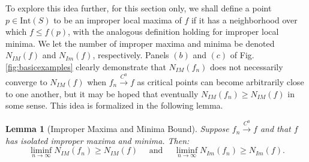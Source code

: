 \documentclass[11pt]{article}
\newcommand{\1}{\mathbf{1}}
\newtheorem{lemma}{Lemma}%
\theoremstyle{definition}
\theoremstyle{remark}
\begin{document}
To explore this idea further, for this section only, we shall define a point $p\in \text{Int}(S)$ to be an improper local maxima of $f$ if it has a neighborhood over which $f\leq f(p)$, with the analogous definition holding for improper local minima. We let the number of improper maxima and minima be denoted $N_{IM}(f)$ and $N_{Im}(f)$, respectively. Panels $(b)$ and $(c)$ of Fig. \ref{fig:basicexamples} clearly demonstrate that $N_{IM}(f_n)$ does not necessarily converge to $N_{IM}(f)$ when $f_n\xrightarrow{C^0}f$ as critical points can become arbitrarily close to one another, but it may be hoped that eventually $N_{IM}(f_n)\geq N_{IM}(f)$ in some sense. This idea is formalized in the following lemma.
\begin{mdframed}
    \begin{lemma}[Improper Maxima and Minima Bound]\label{lemma:max_bdd}
        Suppose $f_n\xrightarrow{C^0}f$ and 
        that $f$ has isolated improper maxima and minima. Then:
        \begin{equation}\nonumber
            \liminf_{n\rightarrow \infty} N_{IM}(f_n)\geq N_{IM}(f) \quad \text{ and }\quad \liminf_{n\rightarrow \infty} N_{Im}(f_n)\geq N_{Im}(f).
        \end{equation}
    \end{lemma}
    \vspace{0.1cm}
\end{mdframed}
\end{document}
